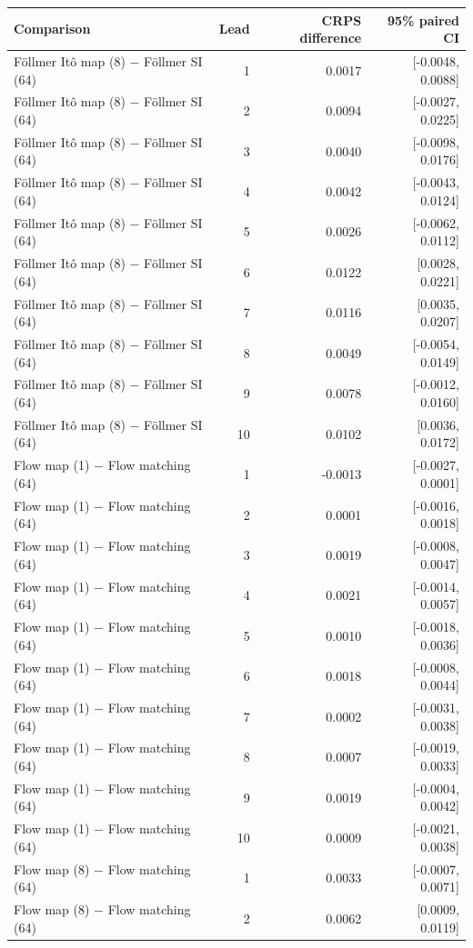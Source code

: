 \begin{tabular}{lrrr}
\toprule
Comparison & Lead & CRPS difference & 95\% paired CI \\
\midrule
Föllmer Itô map (8) $-$ Föllmer SI (64) & 1 & 0.0017 & [-0.0048, 0.0088] \\
Föllmer Itô map (8) $-$ Föllmer SI (64) & 2 & 0.0094 & [-0.0027, 0.0225] \\
Föllmer Itô map (8) $-$ Föllmer SI (64) & 3 & 0.0040 & [-0.0098, 0.0176] \\
Föllmer Itô map (8) $-$ Föllmer SI (64) & 4 & 0.0042 & [-0.0043, 0.0124] \\
Föllmer Itô map (8) $-$ Föllmer SI (64) & 5 & 0.0026 & [-0.0062, 0.0112] \\
Föllmer Itô map (8) $-$ Föllmer SI (64) & 6 & 0.0122 & [0.0028, 0.0221] \\
Föllmer Itô map (8) $-$ Föllmer SI (64) & 7 & 0.0116 & [0.0035, 0.0207] \\
Föllmer Itô map (8) $-$ Föllmer SI (64) & 8 & 0.0049 & [-0.0054, 0.0149] \\
Föllmer Itô map (8) $-$ Föllmer SI (64) & 9 & 0.0078 & [-0.0012, 0.0160] \\
Föllmer Itô map (8) $-$ Föllmer SI (64) & 10 & 0.0102 & [0.0036, 0.0172] \\
Flow map (1) $-$ Flow matching (64) & 1 & -0.0013 & [-0.0027, 0.0001] \\
Flow map (1) $-$ Flow matching (64) & 2 & 0.0001 & [-0.0016, 0.0018] \\
Flow map (1) $-$ Flow matching (64) & 3 & 0.0019 & [-0.0008, 0.0047] \\
Flow map (1) $-$ Flow matching (64) & 4 & 0.0021 & [-0.0014, 0.0057] \\
Flow map (1) $-$ Flow matching (64) & 5 & 0.0010 & [-0.0018, 0.0036] \\
Flow map (1) $-$ Flow matching (64) & 6 & 0.0018 & [-0.0008, 0.0044] \\
Flow map (1) $-$ Flow matching (64) & 7 & 0.0002 & [-0.0031, 0.0038] \\
Flow map (1) $-$ Flow matching (64) & 8 & 0.0007 & [-0.0019, 0.0033] \\
Flow map (1) $-$ Flow matching (64) & 9 & 0.0019 & [-0.0004, 0.0042] \\
Flow map (1) $-$ Flow matching (64) & 10 & 0.0009 & [-0.0021, 0.0038] \\
Flow map (8) $-$ Flow matching (64) & 1 & 0.0033 & [-0.0007, 0.0071] \\
Flow map (8) $-$ Flow matching (64) & 2 & 0.0062 & [0.0009, 0.0119] \\

\end{tabular}
